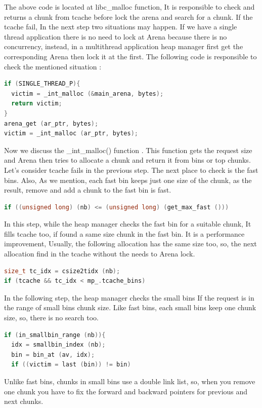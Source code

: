 \documentclass{masterthesis}
\newcommand*\tch{tcache}
\newcommand*\fb{fast bins}
\newcommand*\sbs{small bins}
\begin{document}
The above code is located at libc\_malloc function, It is responsible to check and returns a chunk from \tch{} before lock the arena and search for a chunk. If the \tch{} fail, In the next step two situations may happen. If we have a single thread application there is no need to lock at Arena because there is no concurrency, instead, in a multi\-thread application heap manager first get the corresponding Arena then lock it at the first. The following code is responsible to check the mentioned situation :
\begin{lstlisting}[language=c,frame=tlrb]
if (SINGLE_THREAD_P){
  victim = _int_malloc (&main_arena, bytes);
  return victim;
}
arena_get (ar_ptr, bytes);
victim = _int_malloc (ar_ptr, bytes);
\end{lstlisting}

Now we discuss the \_int\_malloc() function . This function gets the request size and Arena then tries to allocate a chunk and return it from bins or top chunks. Let's consider \tch{} fails in the previous step. The next place to check is the \fb{}. Also, As we mention, each fast bin keeps just one size of the chunk, as the result, remove and add a chunk to the fast bin is fast.
\begin{lstlisting}[language=c,frame=tlrb]
if ((unsigned long) (nb) <= (unsigned long) (get_max_fast ()))
\end{lstlisting}
In this step, while the heap manager checks the fast bin for a suitable chunk, It fills \tch{} too, if found a same size chunk in the fast bin. It is a performance improvement, Usually, the following allocation has the same size too, so, the next allocation find in the \tch{} without the needs to Arena lock.
\begin{lstlisting}[language=c,frame=tlrb]
size_t tc_idx = csize2tidx (nb);
if (tcache && tc_idx < mp_.tcache_bins)
\end{lstlisting}

In the following step, the heap manager checks the \sbs{} If the request is in the range of \sbs{} chunk size. Like \fb{}, each \sbs{} keep one chunk size, so, there is no search too.
\begin{lstlisting}[language=c,frame=tlrb]
if (in_smallbin_range (nb)){
  idx = smallbin_index (nb);
  bin = bin_at (av, idx);
  if ((victim = last (bin)) != bin)
\end{lstlisting}

Unlike \fb{}, chunks in \sbs{} use a double link list, so, when you remove one chunk you have to fix the forward and backward pointers for previous and next chunks. 
\end{document}
